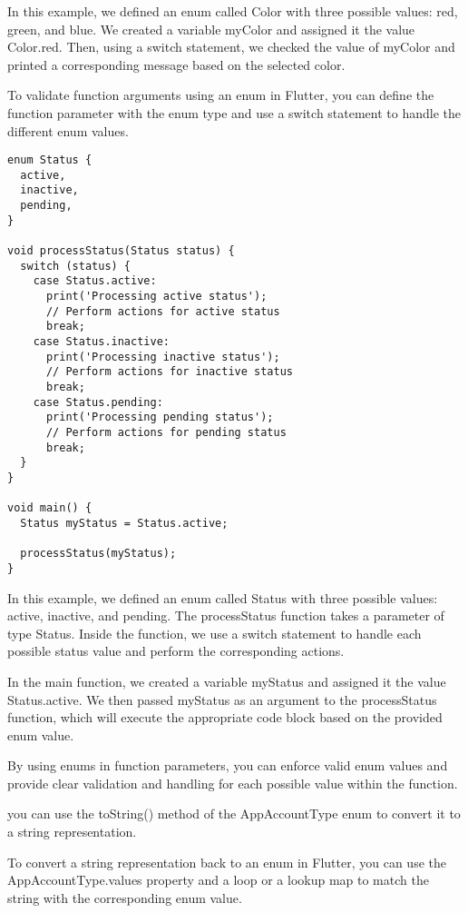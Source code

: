 In this example, we defined an enum called Color with three possible values: red, green, and blue. We created a 
variable myColor and assigned it the value Color.red. Then, using a switch statement, we checked the value of 
myColor and printed a corresponding message based on the selected color.

To validate function arguments using an enum in Flutter, you can define the function parameter with the enum type and 
use a switch statement to handle the different enum values.

\begin{lstlisting}
enum Status {
  active,
  inactive,
  pending,
}

void processStatus(Status status) {
  switch (status) {
    case Status.active:
      print('Processing active status');
      // Perform actions for active status
      break;
    case Status.inactive:
      print('Processing inactive status');
      // Perform actions for inactive status
      break;
    case Status.pending:
      print('Processing pending status');
      // Perform actions for pending status
      break;
  }
}

void main() {
  Status myStatus = Status.active;

  processStatus(myStatus);
}
\end{lstlisting}

In this example, we defined an enum called Status with three possible values: active, inactive, and pending. The 
processStatus function takes a parameter of type Status. Inside the function, we use a switch statement to 
handle each possible status value and perform the corresponding actions.

In the main function, we created a variable myStatus and assigned it the value Status.active. We then passed 
myStatus as an argument to the processStatus function, which will execute the appropriate code block based on 
the provided enum value.

By using enums in function parameters, you can enforce valid enum values and provide clear validation and handling 
for each possible value within the function.

you can use the toString() method of the AppAccountType enum to convert it to a string representation.

To convert a string representation back to an enum in Flutter, you can use the AppAccountType.values property and a 
loop or a lookup map to match the string with the corresponding enum value.

